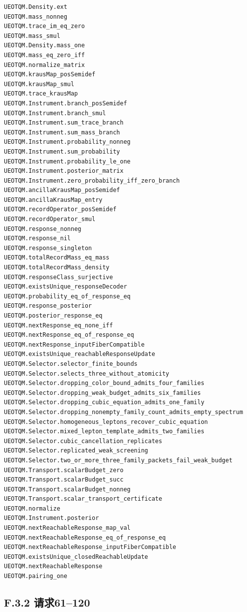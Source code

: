 \documentclass[
  11pt,
  oneside]{book}
\begin{document}
\begin{Verbatim}[breaklines,breakanywhere,fontsize=\scriptsize]
UEOTQM.Density.ext
UEOTQM.mass_nonneg
UEOTQM.trace_im_eq_zero
UEOTQM.mass_smul
UEOTQM.Density.mass_one
UEOTQM.mass_eq_zero_iff
UEOTQM.normalize_matrix
UEOTQM.krausMap_posSemidef
UEOTQM.krausMap_smul
UEOTQM.trace_krausMap
UEOTQM.Instrument.branch_posSemidef
UEOTQM.Instrument.branch_smul
UEOTQM.Instrument.sum_trace_branch
UEOTQM.Instrument.sum_mass_branch
UEOTQM.Instrument.probability_nonneg
UEOTQM.Instrument.sum_probability
UEOTQM.Instrument.probability_le_one
UEOTQM.Instrument.posterior_matrix
UEOTQM.Instrument.zero_probability_iff_zero_branch
UEOTQM.ancillaKrausMap_posSemidef
UEOTQM.ancillaKrausMap_entry
UEOTQM.recordOperator_posSemidef
UEOTQM.recordOperator_smul
UEOTQM.response_nonneg
UEOTQM.response_nil
UEOTQM.response_singleton
UEOTQM.totalRecordMass_eq_mass
UEOTQM.totalRecordMass_density
UEOTQM.responseClass_surjective
UEOTQM.existsUnique_responseDecoder
UEOTQM.probability_eq_of_response_eq
UEOTQM.response_posterior
UEOTQM.posterior_response_eq
UEOTQM.nextResponse_eq_none_iff
UEOTQM.nextResponse_eq_of_response_eq
UEOTQM.nextResponse_inputFiberCompatible
UEOTQM.existsUnique_reachableResponseUpdate
UEOTQM.Selector.selector_finite_bounds
UEOTQM.Selector.selects_three_without_atomicity
UEOTQM.Selector.dropping_color_bound_admits_four_families
UEOTQM.Selector.dropping_weak_budget_admits_six_families
UEOTQM.Selector.dropping_cubic_equation_admits_one_family
UEOTQM.Selector.dropping_nonempty_family_count_admits_empty_spectrum
UEOTQM.Selector.homogeneous_leptons_recover_cubic_equation
UEOTQM.Selector.mixed_lepton_template_admits_two_families
UEOTQM.Selector.cubic_cancellation_replicates
UEOTQM.Selector.replicated_weak_screening
UEOTQM.Selector.two_or_more_three_family_packets_fail_weak_budget
UEOTQM.Transport.scalarBudget_zero
UEOTQM.Transport.scalarBudget_succ
UEOTQM.Transport.scalarBudget_nonneg
UEOTQM.Transport.scalar_transport_certificate
UEOTQM.normalize
UEOTQM.Instrument.posterior
UEOTQM.nextReachableResponse_map_val
UEOTQM.nextReachableResponse_eq_of_response_eq
UEOTQM.nextReachableResponse_inputFiberCompatible
UEOTQM.existsUnique_closedReachableUpdate
UEOTQM.nextReachableResponse
UEOTQM.pairing_one
\end{Verbatim}

\hypertarget{f.3.2-ux8bf7ux6c4261120}{%
\subsection{F.3.2 请求61--120}\label{f.3.2-ux8bf7ux6c4261120}}
\end{document}
